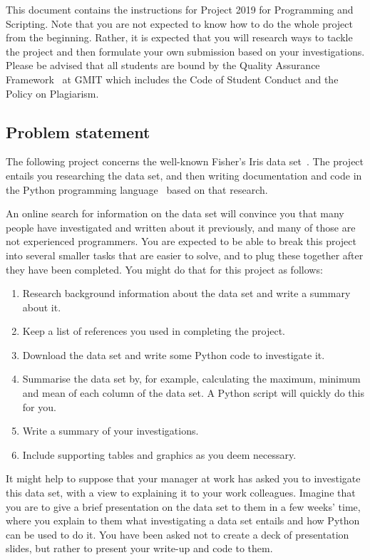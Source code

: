 \documentclass[12pt, a4paper, hidelinks]{scrartcl}
\title{\projectname}
\author{\modulename}
\date{Due: \duedate}
\newcommand{\modulename}{Programming and Scripting}
\newcommand{\projectyear}{2019}
\newcommand{\projectname}{Project \projectyear}
\begin{document}
  
\maketitle

\noindent
This document contains the instructions for \projectname{} for \modulename{}.
Note that you are not expected to know how to do the whole project from the beginning.
Rather, it is expected that you will research ways to tackle the project and then formulate your own submission based on your investigations.
Please be advised that all students are bound by the Quality Assurance Framework~\cite{gmitqaf} at GMIT which includes the Code of Student Conduct and the Policy on Plagiarism.

\subsection*{Problem statement}
  The following project concerns the well-known Fisher's Iris data set~\cite{irisdataset}.
  The project entails you researching the data set, and then writing documentation and code in the Python programming language~\cite{pythonwebsite} based on that research.
  
  An online search for information on the data set will convince you that many people have investigated and written about it previously, and many of those are not experienced programmers.
  You are expected to be able to break this project into several smaller tasks that are easier to solve, and to plug these together after they have been completed.
  You might do that for this project as follows:
  \begin{enumerate}
    \item Research background information about the data set and write a summary about it.
    \item Keep a list of references you used in completing the project.
    \item Download the data set and write some Python code to investigate it.
    \item Summarise the data set by, for example, calculating the maximum, minimum and mean of each column of the data set. A Python script will quickly do this for you.
    \item Write a summary of your investigations.
    \item Include supporting tables and graphics as you deem necessary.
  \end{enumerate}

  It might help to suppose that your manager at work has asked you to investigate this data set, with a view to explaining it to your work colleagues.
  Imagine that you are to give a brief presentation on the data set to them in a few weeks' time, where you explain to them what investigating a data set entails and how Python can be used to do it.
  You have been asked not to create a deck of presentation slides, but rather to present your write-up and code to them.
\end{document}
